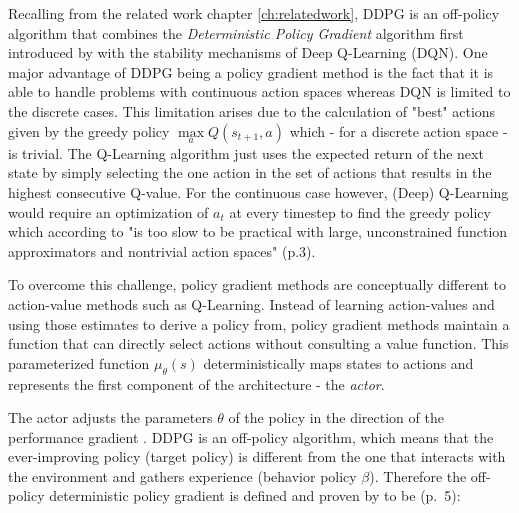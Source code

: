 Recalling from the related work chapter \ref{ch:relatedwork}, DDPG is an off-policy algorithm that combines the \textit{Deterministic Policy Gradient} algorithm first introduced by \cite{silver2014deterministic} with the stability mechanisms of Deep Q-Learning (DQN). One major advantage of DDPG being a policy gradient method is the fact that it is able to handle problems with continuous action spaces  \cite[p.3]{lillicrap2019continuous} whereas DQN is limited to the discrete cases. This limitation arises due to the calculation of "best" actions given by the greedy policy $\max\limits_{a} Q(s_{t+1},a)$ which - for a discrete action space - is trivial. The Q-Learning algorithm just uses the expected return of the next state by simply selecting the one action in the set of actions that results in the highest consecutive Q-value. For the continuous case however, (Deep) Q-Learning would require an optimization of $a_t$ at every timestep to find the greedy policy which according to \cite{lillicrap2019continuous} "is too slow to be practical with large, unconstrained function approximators and nontrivial action spaces" (p.3).
\par
To overcome this challenge, policy gradient methods are conceptually different to action-value methods such as Q-Learning. Instead of learning action-values and using those estimates to derive a policy from, policy gradient methods maintain a function that can directly select actions without consulting a value function. This parameterized function $\mu_\theta(s)$ deterministically maps states to actions \cite[p.3]{lillicrap2019continuous} and represents the first component of the architecture - the \textit{actor}.
\par 
The actor adjusts the parameters $\theta$ of the policy in the direction of the performance gradient \cite[p.~2]{silver2014deterministic}. DDPG is an off-policy algorithm, which means that the ever-improving policy (target policy) is different from the one that interacts with the environment and gathers experience (behavior policy $\beta$). Therefore the off-policy deterministic policy gradient is defined and proven by \cite{silver2014deterministic} to be (p.~5): 

